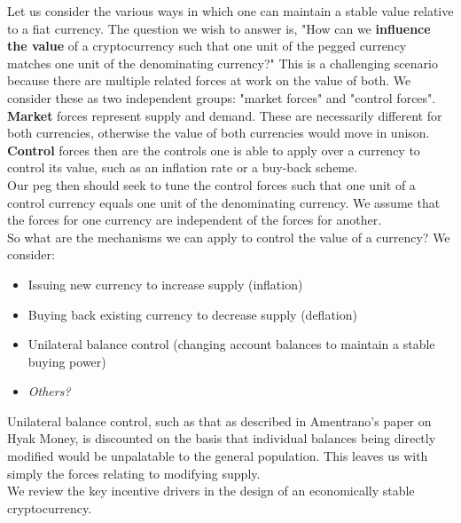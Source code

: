 \documentclass{article}
\begin{document}
\noindent Let us consider the various ways in which one can maintain a stable value relative to a fiat currency. The question we wish to answer is, "How can we \textbf{influence the value} of a cryptocurrency such that one unit of the pegged currency matches one unit of the denominating currency?" This is a challenging scenario because there are multiple related forces at work on the value of both. We consider these as two independent groups: "market forces" and "control forces". \\

\noindent \textbf{Market} forces represent supply and demand. These are necessarily different for both currencies, otherwise the value of both currencies would move in unison. \\

\noindent \textbf{Control} forces then are the controls one is able to apply over a currency to control its value, such as an inflation rate or a buy-back scheme. \\

\noindent Our peg then should seek to tune the control forces such that one unit of a control currency equals one unit of the denominating currency. We assume that the forces for one currency are independent of the forces for another. \\

\noindent So what are the mechanisms we can apply to control the value of a currency? We consider:

\begin{itemize}
	\item Issuing new currency to increase supply (inflation)
	\item Buying back existing currency to decrease supply (deflation)
	\item Unilateral balance control (changing account balances to maintain a stable buying power)
	\item \textit{Others?}
\end{itemize}

\noindent Unilateral balance control, such as that as described in Amentrano's paper on Hyak Money, is discounted on the basis that individual balances being directly modified would be unpalatable to the general population. This leaves us with simply the forces relating to modifying supply. \\

\noindent We review the key incentive drivers in the design of an economically stable cryptocurrency. \\
\end{document}
